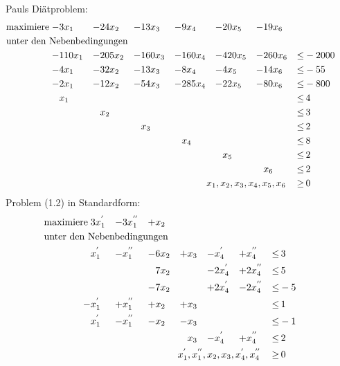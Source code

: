 \documentclass[10pt,a4paper,oneside,ngerman,numbers=noenddot]{scrartcl}
\begin{document}
	\subsection{} %
\section{} %
	\subsection{} %
	Pauls Diätproblem:\\
	\begin{alignat*}{7}
		\text{maximiere}\; -& 3x_{1} &-& 24x_{2} &-& 13x_{3} &-& 9x_{4} &-& 20x_{5} &-& 19x_{6} && \\
		\multicolumn{14}{l}{\text{unter den Nebenbedingungen}} && \\
		- & 110x_{1} &-& 205x_{2} &-& 160x_{3} &-& 160x_{4} &-& 420x_{5} &-& 260x_{6} &\leq & -2000 \\
		-& 4x_{1} &-& 32x_{2} &-& 13x_{3} &-& 8x_{4} &-& 4x_{5} &-& 14x_{6} &\leq & -55 \\
		-& 2x_{1} &-& 12x_{2} &-& 54x_{3} &-& 285x_{4} &-& 22x_{5} &-& 80x_{6} &\leq & -800 \\
		& x_{1} && && && && && &\leq &\, 4 \\
		& && x_{2} && && && && &\leq &\, 3 \\
		& && && x_{3} && && && &\leq &\, 2 \\
		& && && && x_{4} && && &\leq &\, 8 \\
		& && && && && x_{5} && &\leq &\, 2 \\
		& && && && && && x_{6} &\leq &\, 2 \\
		\multicolumn{12}{r}{$x_{1}, x_{2}, x_{3}, x_{4}, x_{5}, x_{6}$} \,&\geq &\, 0
		\end{alignat*}
		Problem (1.2) in Standardform:\\
		\begin{alignat*}{7}
		\text{maximiere}\; & 3x_{1}^{'} &-& 3x_{1}^{''} &+& x_{2} && && && \\
		\multicolumn{14}{l}{\text{unter den Nebenbedingungen}} && \\
		& x_{1}^{'} &-& x_{1}^{''} &-& 6x_{2} &+& x_{3} &-& x_{4}^{'} &+& x_{4}^{''} &\leq &\, 3 \\
		& && && 7x_{2} && &-& 2x_{4}^{'} &+& 2x_{4}^{''} &\leq &\, 5 \\
		& && &-& 7x_{2} && &+& 2x_{4}^{'} &-& 2x_{4}^{''} &\leq & -5 \\
		-& x_{1}^{'} &+& x_{1}^{''} &+& x_{2} &+& x_{3} && && &\leq &\, 1 \\
		& x_{1}^{'} &-& x_{1}^{''} &-& x_{2} &-& x_{3} && && &\leq & -1 \\
		& && && && x_{3} &-& x_{4}^{'} &+& x_{4}^{''} &\leq &\, 2 \\
		\multicolumn{12}{r}{$x_{1}^{'}, x_{1}^{''}, x_{2}, x_{3}, x_{4}^{'}, x_{4}^{''}$} \,&\geq &\, 0
		\end{alignat*}
\end{document}
